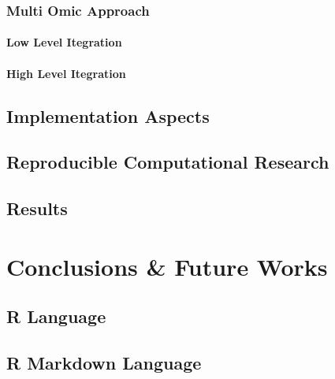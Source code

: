 \documentclass[b5paper,oneside,british,intoc,bibliograph=totoc,index=totoc,BCOR10mm,twoside,openright]{book}
\numberwithin{equation}{section}
\numberwithin{figure}{section}
\begin{document}
\subsection{Multi Omic Approach}
\subsubsection{Low Level Itegration}
\subsubsection{High Level Itegration}
\section{Implementation Aspects}
\section{Reproducible Computational Research}
\section{Results}

\chapter{Conclusions \& Future Works}


\begin{appendices}
\section{R Language}
\section{R Markdown Language}
%
%
%
\end{appendices}

%
%
%
%
%
%

%
%
%

\printbibliography[heading=bibnumbered]

\cleardoublepage
{}
\listoffigures

\cleardoublepage
{}
\listoftables

\end{document}
